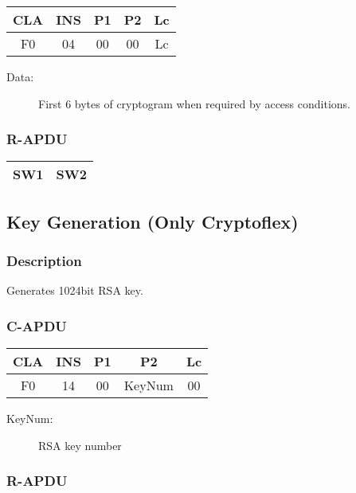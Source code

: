 \documentclass[a4paper,oneside]{article}
\begin{document}
\begin{tabular}{|c|c|c|c|c|} \hline
CLA & INS & P1 & P2 & Lc \\ \hline \hline
F0 & 04 & 00 & 00 & Lc \\ \hline
\end{tabular}

\begin{description}
\item[Data:] First 6 bytes of cryptogram when required by access conditions.
\end{description}

\subsubsection*{R-APDU}

\begin{tabular}{|c|c|} \hline
SW1 & SW2 \\ \hline
\end{tabular}


\subsection{Key Generation (Only Cryptoflex)}

\subsubsection*{Description}

Generates 1024bit RSA key.

\subsubsection*{C-APDU}

\begin{tabular}{|c|c|c|c|c|} \hline
CLA & INS & P1 & P2 & Lc \\ \hline \hline
F0 & 14 & 00 & KeyNum & 00 \\ \hline
\end{tabular}

\begin{description}
\item[KeyNum:] RSA key number
\end{description}

\subsubsection*{R-APDU}
\end{document}
